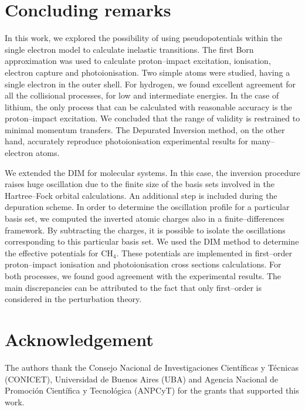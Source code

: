 \documentclass[10pt]{article}
\begin{document}
\section{Concluding remarks}

In this work, we explored the possibility of using pseudopotentials 
within the single electron model to calculate inelastic transitions. 
The first Born approximation was used to calculate proton--impact 
excitation, ionisation, electron capture and photoionisation. Two simple
atoms were studied, having a single electron in the outer shell. For 
hydrogen, we found excellent agreement for all the collisional processes, for 
low and intermediate energies. In the case of lithium, the only process
that can be calculated with reasonable accuracy is the proton--impact
excitation. We concluded that the range of validity is restrained to minimal
momentum transfers. 
The Depurated Inversion method, on the other hand, accurately reproduce
photoionisation experimental results for many--electron atoms. 

We extended the DIM for molecular systems. In this case, the inversion
procedure raises huge oscillation due to the finite size of the basis sets
involved 
in the Hartree--Fock orbital calculations. An additional step is included 
during the depuration scheme. In order to determine the oscillation profile
for a particular basis set, we computed the inverted atomic charges also in
a finite--differences framework. By subtracting the charges, it is possible
to isolate the oscillations corresponding to this particular basis set.
We used the DIM method to determine the effective potentials for CH$_4$.
These potentials are implemented in first--order proton--impact ionisation
and photoionisation cross sections calculations. For both processes, we
found good agreement with the experimental results. The main
discrepancies can be attributed to the fact that only first--order is 
considered in the perturbation theory.


\section*{Acknowledgement}
The authors thank the Consejo Nacional de Investigaciones 
Cient\'ificas y T\'ecnicas (CONICET), Universidad de Buenos Aires (UBA)
and Agencia Nacional de Promoci\'on Cient\'ifica y Tecnol\'ogica (ANPCyT)
for the grants that supported this work.


% 
% 
\end{document}
